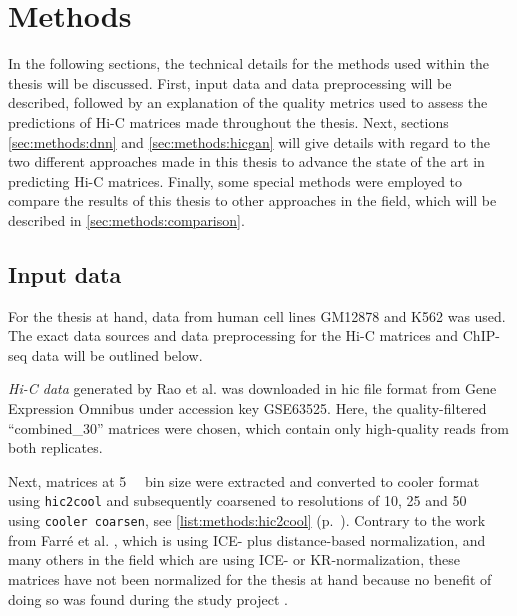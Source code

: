 \section{Methods}
In the following sections, the technical details for the methods used within the thesis will be discussed.
First, input data and data preprocessing will be described, followed by an explanation of the quality metrics used to assess the predictions
of Hi-C matrices made throughout the thesis.
Next, sections \ref{sec:methods:dnn} and \ref{sec:methods:hicgan} will give details with regard to the two 
different approaches made in this thesis to advance the state of the art in predicting Hi-C matrices.
Finally, some special methods were employed to compare the results of this thesis to 
other approaches in the field, which will be described in \cref{sec:methods:comparison}.

\subsection{Input data} \label{sec:methods:input_data}
For the thesis at hand, data from human cell lines GM12878 and K562 was used.
The exact data sources and data preprocessing for the Hi-C matrices and ChIP-seq data 
will be outlined below.

\emph{Hi-C data} generated by Rao et al. \cite{Rao2014} was downloaded 
in hic file format from Gene Expression Omnibus under accession key GSE63525.
Here, the quality-filtered ``combined\_30'' matrices were chosen, which contain only high-quality reads from 
both replicates.

Next, matrices at \SI{5}{\kilo\bp} bin size were extracted and converted to cooler format using \texttt{hic2cool}
and subsequently coarsened to resolutions of 10, 25 and \SI{50}{\kilo\bp} using \texttt{cooler coarsen},
see \cref{list:methods:hic2cool} (p.~\pageref{list:methods:hic2cool}).
Contrary to the work from Farr\'e et al. \cite{Farre2018a}, which is using ICE- plus distance-based normalization,
and many others in the field which are using ICE- or KR-normalization, 
these matrices have not been normalized for the thesis at hand
because no benefit of doing so was found during the study project \cite{Krauth2020}.

